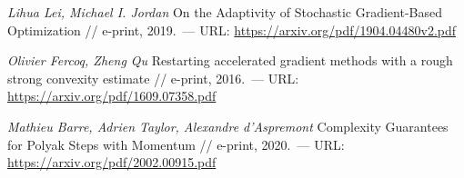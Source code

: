 \documentclass{crm-article}
\begin{document}
\begin{thebibliography}{99}

	\textit{Lihua Lei, Michael I. Jordan} On the Adaptivity of Stochastic Gradient-Based
  Optimization // e-print, 2019.~--- URL: \url{https://arxiv.org/pdf/1904.04480v2.pdf}

	\textit{Olivier Fercoq, Zheng Qu} Restarting accelerated gradient methods with a rough strong convexity estimate // e-print, 2016.~--- URL: \url{https://arxiv.org/pdf/1609.07358.pdf}

\textit{Mathieu Barre, Adrien Taylor, Alexandre d’Aspremont} Complexity Guarantees for Polyak Steps with Momentum // e-print, 2020.~--- URL: \url{https://arxiv.org/pdf/2002.00915.pdf}

\end{thebibliography}
\end{document}
